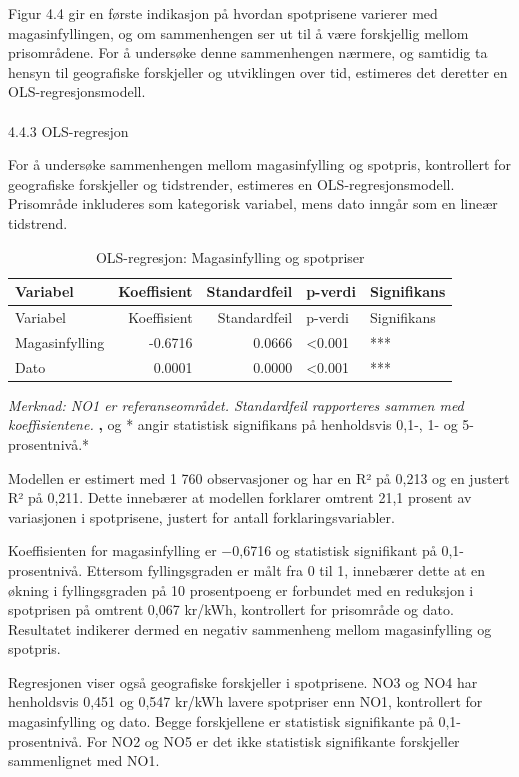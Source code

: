 \documentclass[
  letterpaper,
  DIV=11,
  numbers=noendperiod]{scrartcl}
\makeatletter
\let\oldparagraph\paragraph
\renewcommand{\paragraph}{
    \@ifstar
      \xxxParagraphStar
      \xxxParagraphNoStar
  }
\newcommand{\xxxParagraphStar}[1]{\oldparagraph*{#1}\mbox{}}
\newcommand{\xxxParagraphNoStar}[1]{\oldparagraph{#1}\mbox{}}
\makeatother
\begin{document}
Figur 4.4 gir en første indikasjon på hvordan spotprisene varierer med
magasinfyllingen, og om sammenhengen ser ut til å være forskjellig
mellom prisområdene. For å undersøke denne sammenhengen nærmere, og
samtidig ta hensyn til geografiske forskjeller og utviklingen over tid,
estimeres det deretter en OLS-regresjonsmodell.

\paragraph{4.4.3 OLS-regresjon}\label{ols-regresjon}

For å undersøke sammenhengen mellom magasinfylling og spotpris,
kontrollert for geografiske forskjeller og tidstrender, estimeres en
OLS-regresjonsmodell. Prisområde inkluderes som kategorisk variabel,
mens dato inngår som en lineær tidstrend.

\begin{longtable}[]{@{}lrrll@{}}
\caption{OLS-regresjon: Magasinfylling og spotpriser}\tabularnewline
\toprule\noalign{}
Variabel & Koeffisient & Standardfeil & p-verdi & Signifikans \\
\midrule\noalign{}
\endfirsthead
\toprule\noalign{}
Variabel & Koeffisient & Standardfeil & p-verdi & Signifikans \\
\midrule\noalign{}
\endhead
\bottomrule\noalign{}
\endlastfoot
Magasinfylling & -0.6716 & 0.0666 & \textless0.001 & *** \\
Dato & 0.0001 & 0.0000 & \textless0.001 & *** \\
\end{longtable}

\emph{Merknad: NO1 er referanseområdet. Standardfeil rapporteres sammen
med koeffisientene.} \textbf{,} og * angir statistisk signifikans på
henholdsvis 0,1-, 1- og 5-prosentnivå.*

Modellen er estimert med 1 760 observasjoner og har en R² på 0,213 og en
justert R² på 0,211. Dette innebærer at modellen forklarer omtrent 21,1
prosent av variasjonen i spotprisene, justert for antall
forklaringsvariabler.

Koeffisienten for magasinfylling er −0,6716 og statistisk signifikant på
0,1-prosentnivå. Ettersom fyllingsgraden er målt fra 0 til 1, innebærer
dette at en økning i fyllingsgraden på 10 prosentpoeng er forbundet med
en reduksjon i spotprisen på omtrent 0,067 kr/kWh, kontrollert for
prisområde og dato. Resultatet indikerer dermed en negativ sammenheng
mellom magasinfylling og spotpris.

Regresjonen viser også geografiske forskjeller i spotprisene. NO3 og NO4
har henholdsvis 0,451 og 0,547 kr/kWh lavere spotpriser enn NO1,
kontrollert for magasinfylling og dato. Begge forskjellene er statistisk
signifikante på 0,1-prosentnivå. For NO2 og NO5 er det ikke statistisk
signifikante forskjeller sammenlignet med NO1.
\end{document}
